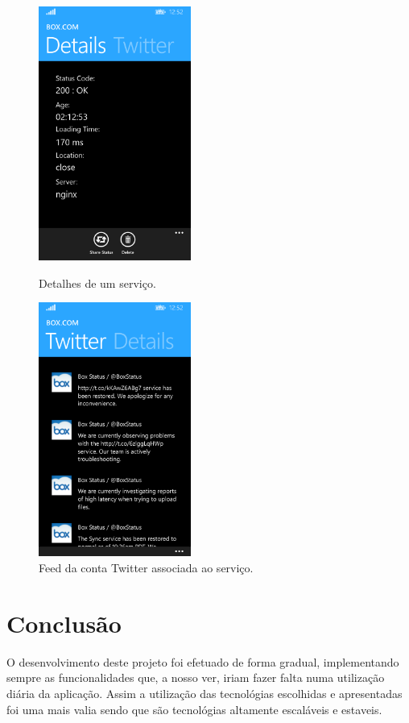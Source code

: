 \documentclass[12pt]{article}
\begin{document}
\begin{figure}[ht!]
\centering
\parbox{5cm}{
\includegraphics[width=5cm]{4.png}
\caption{Detalhes de um serviço.}
\label{fig:2figsA}}
\qquad
\begin{minipage}{5cm}
\includegraphics[width=5cm]{5.png}
\caption{Feed da conta Twitter associada ao serviço.}
\label{fig:2figsB}
\end{minipage}
\end{figure}
\newpage
\section{Conclusão}

O desenvolvimento deste projeto foi efetuado de forma gradual, implementando sempre as funcionalidades que, a nosso ver, iriam fazer falta numa utilização diária da aplicação. Assim a utilização das tecnológias escolhidas e apresentadas foi uma mais valia sendo que são tecnológias altamente escaláveis e estaveis.
\end{document}
